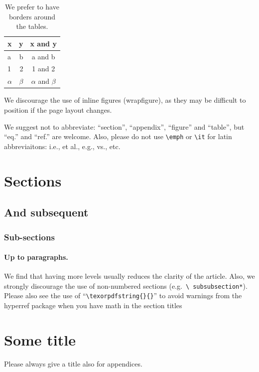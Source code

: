 \documentclass[a4paper,11pt]{article}
\begin{document}
\begin{table}[tbp]
\centering
\begin{tabular}{|lr|c|}
\hline
x&y&x and y\\
\hline 
a & b & a and b\\
1 & 2 & 1 and 2\\
$\alpha$ & $\beta$ & $\alpha$ and $\beta$\\
\hline
\end{tabular}
\caption{\label{tab:i} We prefer to have borders around the tables.}
\end{table}

We discourage the use of inline figures (wrapfigure), as they may be
difficult to position if the page layout changes.

We suggest not to abbreviate: ``section'', ``appendix'', ``figure''
and ``table'', but ``eq.'' and ``ref.'' are welcome. Also, please do
not use \texttt{\textbackslash emph} or \texttt{\textbackslash it} for
latin abbreviaitons: i.e., et al., e.g., vs., etc.



\section{Sections}
\subsection{And subsequent}
\subsubsection{Sub-sections}
\paragraph{Up to paragraphs.} We find that having more levels usually
reduces the clarity of the article. Also, we strongly discourage the
use of non-numbered sections (e.g.~\texttt{\textbackslash
  subsubsection*}).  Please also see the use of
``\texttt{\textbackslash texorpdfstring\{\}\{\}}'' to avoid warnings
from the hyperref package when you have math in the section titles



\appendix
\section{Some title}
Please always give a title also for appendices.
\end{document}
